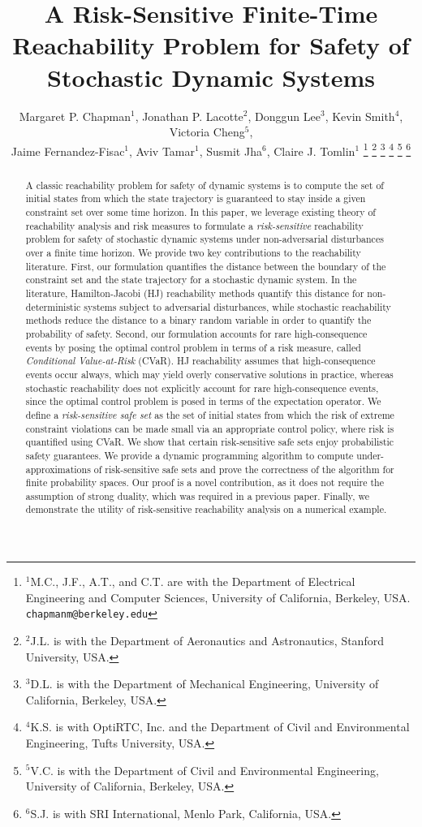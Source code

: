 \documentclass[letterpaper, 10 pt, conference]{ieeeconf}  %
\title{\LARGE \bf
A Risk-Sensitive Finite-Time Reachability Problem for Safety of Stochastic Dynamic Systems}
\author{Margaret P. Chapman$^{1}$, Jonathan P. Lacotte$^{2}$, Donggun Lee$^{3}$, Kevin Smith$^{4}$, Victoria Cheng$^{5}$,\\ 
Jaime Fernandez-Fisac$^{1}$, Aviv Tamar$^{1}$, Susmit Jha$^{6}$, Claire J. Tomlin$^{1}$%
\thanks{$^{1}$M.C., J.F., A.T., and C.T. are with the Department of Electrical Engineering and Computer Sciences, University of California, Berkeley, USA.
        {\tt\small chapmanm@berkeley.edu}}%
\thanks{$^{2}$J.L. is with the Department of Aeronautics and Astronautics, Stanford University, USA.
        }%
\thanks{$^{3}$D.L. is with the Department of Mechanical Engineering, University of California, Berkeley, USA.
        }%
\thanks{$^{4}$K.S. is with OptiRTC, Inc. and the Department of Civil and Environmental Engineering, Tufts University, USA.
        }%
\thanks{$^{5}$V.C. is with the Department of Civil and Environmental Engineering, University of California, Berkeley, USA.
        }%
\thanks{$^{6}$S.J. is with SRI International, Menlo Park, California, USA.
		}%
}
\begin{document}
\maketitle
\thispagestyle{empty}
\pagestyle{empty}

\begin{abstract}
A classic reachability problem for safety of dynamic systems is to compute the set of initial states from which 
the state trajectory is guaranteed to stay inside a given constraint set over some time horizon. 
In this paper, we leverage existing theory of reachability analysis and risk measures 
to formulate a \textit{risk-sensitive} reachability problem for safety of stochastic dynamic systems under non-adversarial disturbances
over a finite time horizon.
We provide two key contributions to the reachability literature. 
First, our formulation quantifies the distance between the boundary of the constraint set and the state trajectory for a stochastic dynamic system.
In the literature, Hamilton-Jacobi (HJ) reachability methods quantify this distance for non-deterministic systems subject to adversarial disturbances, while
stochastic reachability methods reduce the distance to a binary random variable in order to quantify the probability of safety. 
Second, our formulation accounts for rare high-consequence events by posing the optimal control problem in terms of a risk measure, 
called \textit{Conditional Value-at-Risk} (CVaR).
HJ reachability assumes that high-consequence events occur always, which may yield overly conservative solutions in practice,
whereas stochastic reachability does not explicitly account for rare high-consequence events,
since the optimal control problem is posed in terms of the expectation operator.
We define a \textit{risk-sensitive safe set} as the set of initial states from which the risk of extreme constraint violations
can be made small via an appropriate control policy, where risk is quantified using CVaR.
We show that certain risk-sensitive safe sets enjoy probabilistic safety guarantees.
We provide a dynamic programming algorithm to compute under-approximations of risk-sensitive safe sets
and prove the correctness of the algorithm for finite probability spaces.
Our proof is a novel contribution, as it does not require the assumption of strong duality, which was required in a previous paper.
Finally, we demonstrate the utility of risk-sensitive reachability analysis on a numerical example.
\end{abstract}
\end{document}
